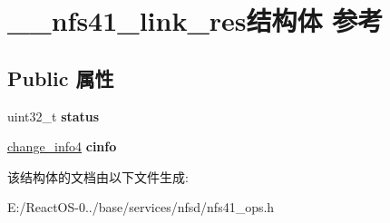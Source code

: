 \hypertarget{struct____nfs41__link__res}{}\section{\+\_\+\+\_\+nfs41\+\_\+link\+\_\+res结构体 参考}
\label{struct____nfs41__link__res}
\subsection*{Public 属性}
\begin{DoxyCompactItemize}
\item 
\mbox{\label{struct____nfs41__link__res_ad7e49992b2e962e5da8e00d514c3ac78}} 
uint32\+\_\+t {\bfseries status}
\item 
\mbox{\label{struct____nfs41__link__res_ac5b225710c9fc02bcabfcbf3508e011a}} 
\hyperlink{struct____change__info4}{change\+\_\+info4} {\bfseries cinfo}
\end{DoxyCompactItemize}


该结构体的文档由以下文件生成\+:\begin{DoxyCompactItemize}
\item 
E\+:/\+React\+O\+S-\/0../base/services/nfsd/nfs41\+\_\+ops.\+h\end{DoxyCompactItemize}

